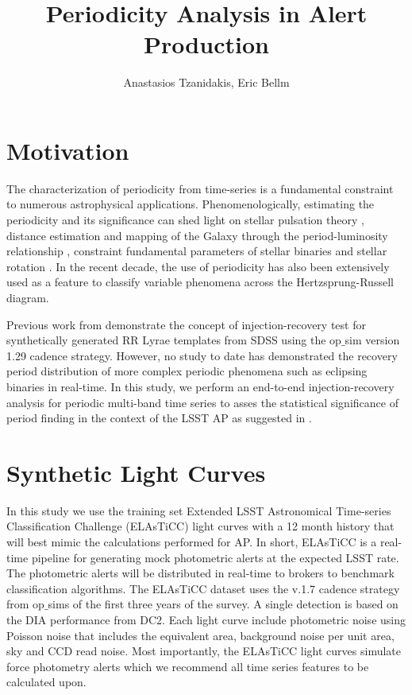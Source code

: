 \documentclass[DM,authoryear,toc]{lsstdoc}
\title{Periodicity Analysis in Alert Production}
\author{%
Anastasios Tzanidakis, Eric Bellm
}
\date{\vcsDate}
\begin{document}
\maketitle



\section{Motivation}
The characterization of periodicity from time-series is a fundamental constraint to numerous astrophysical applications.
Phenomenologically, estimating the periodicity and its significance can shed light on stellar pulsation theory \citep{Antonello:Antonello81}, distance estimation and mapping of the Galaxy through the period-luminosity relationship \citep{Skowron:Skowron2019}, constraint fundamental parameters of stellar binaries \citep{Farinella:Farinella1979} and stellar rotation \citep{Walkowicz:Walkowicz13}.
In the recent decade, the use of periodicity has also been extensively used as a feature to classify variable phenomena \citep{Richards:R13} across the Hertzsprung-Russell diagram.


Previous work from \cite{2012AJ....144....9O} demonstrate the concept of injection-recovery test for synthetically generated RR Lyrae templates from SDSS using the op$\_$sim version 1.29 cadence strategy.
However, no study to date has demonstrated the recovery period distribution of more complex periodic phenomena such as eclipsing binaries in real-time.
In this study, we perform an end-to-end injection-recovery analysis for periodic multi-band time series to asses the statistical significance of period finding in the context of the LSST AP as suggested in .

\section{Synthetic Light Curves}
In this study we use the training set Extended LSST Astronomical Time-series Classification Challenge (ELAsTiCC) light curves with a 12 month history that will best mimic the calculations performed for AP.
In short, ELAsTiCC is a real-time pipeline for generating mock photometric alerts at the expected LSST rate.
The photometric alerts will be distributed in real-time to brokers to benchmark classification algorithms.
The ELAsTiCC dataset uses the v.1.7 cadence strategy from op$\_$sims of the first three years of the survey.
A single detection is based on the DIA performance from DC2.
Each light curve include photometric noise using Poisson noise that includes the equivalent area, background noise per unit area, sky and CCD read noise.
Most importantly, the ELAsTiCC light curves simulate force photometry alerts which we recommend all time series features to be calculated upon.
\end{document}
